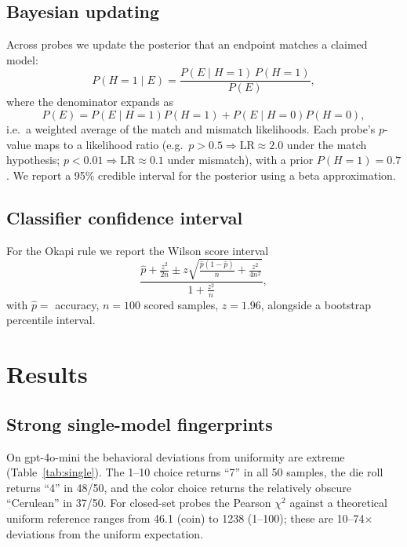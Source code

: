\documentclass[11pt]{article}
\begin{document}
\subsection{Bayesian updating}
Across probes we update the posterior that an endpoint matches a claimed model:
\begin{equation}
P(H{=}1 \mid E) = \frac{P(E \mid H{=}1)\,P(H{=}1)}{P(E)},
\end{equation}
where the denominator expands as
\begin{equation}
P(E) = P(E\mid H{=}1)P(H{=}1) + P(E\mid H{=}0)P(H{=}0),
\end{equation}
i.e.\ a weighted average of the match and mismatch likelihoods. Each probe's $p$-value maps to a likelihood ratio (e.g.\ $p>0.5 \Rightarrow \mathrm{LR}\approx 2.0$ under the match hypothesis; $p<0.01 \Rightarrow \mathrm{LR}\approx 0.1$ under mismatch), with a prior $P(H{=}1)=0.7$. We report a 95\% credible interval for the posterior using a beta approximation.

\subsection{Classifier confidence interval}
For the Okapi rule we report the Wilson score interval
\begin{equation}
\frac{\hat p + \frac{z^2}{2n} \pm z\sqrt{\frac{\hat p(1-\hat p)}{n} + \frac{z^2}{4n^2}}}{1 + \frac{z^2}{n}},
\end{equation}
with $\hat p = $ accuracy, $n=100$ scored samples, $z=1.96$, alongside a bootstrap percentile interval.

\section{Results}

\subsection{Strong single-model fingerprints}
\label{sec:single}

On gpt-4o-mini the behavioral deviations from uniformity are extreme (Table~\ref{tab:single}). The 1--10 choice returns ``7'' in all 50 samples, the die roll returns ``4'' in 48/50, and the color choice returns the relatively obscure ``Cerulean'' in 37/50. For closed-set probes the Pearson $\chi^2$ against a theoretical uniform reference ranges from 46.1 (coin) to 1238 (1--100); these are 10--74$\times$ deviations from the uniform expectation.
\end{document}
